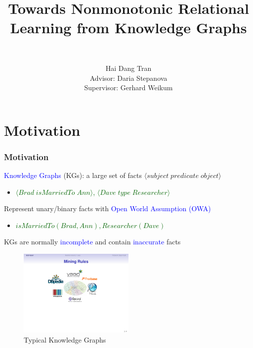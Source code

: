\documentclass{beamer}
\title{Towards Nonmonotonic Relational Learning from Knowledge Graphs}
\author[Stepanova]
 {
   \large{}\\
 }
\author[shortname]{Hai Dang Tran\\Advisor: Daria Stepanova\\Supervisor: Gerhard Weikum}
\institute[shortinst]{Max Planck Institute for Informatics\\
                      Saarland University, Saarbr\"{u}cken, Germany}
\date[]{}
\newcommand{\tuple}[1]{\ensuremath{\langle#1\rangle}}
\newcommand{\bl}[1]{\textcolor{blue}{#1}}
\newcommand{\gr}[1]{\textcolor{darkgreen}{#1}}
\newcommand{\mi}[1]{\ensuremath{\mathit{#1}}}
\begin{document}
\frame{\titlepage}
\addtocounter{framenumber}{-1}


\section{Motivation}
\begin{frame}\frametitle{Motivation}
\medskip
\begin{itemize}
\small{\item \textcolor{blue}{Knowledge Graphs} (KGs): a large set of facts $\tuple{subject\;predicate\;object}$
\begin{itemize}
\item[] \gr{$\tuple{\mi{Brad\;isMarriedTo\;Ann}}$, $\tuple{\mi{Dave \;type\;Researcher}}$}
\end{itemize}
\bigskip

\item Represent unary/binary facts with \textcolor{blue}{Open World Assumption (OWA)}
\begin{itemize}
\item[] \gr{$\mi{isMarriedTo(Brad,Ann), Researcher(Dave)}$}
\end{itemize}
\bigskip

\item KGs are normally \bl{incomplete} and contain \bl{inaccurate} facts


}
\end{itemize}

\begin{figure}[ht]
\includegraphics[width=0.5\textwidth]{kb}
\caption{Typical Knowledge Graphs}
\end{figure}

\end{frame}
\end{document}
